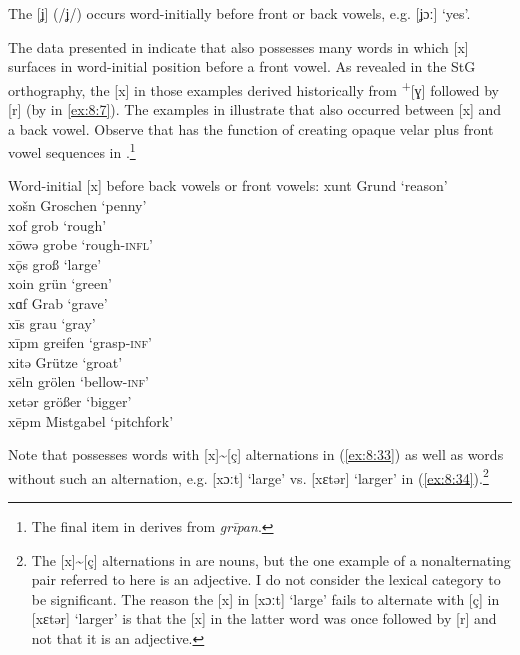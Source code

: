 The  [ʝ] (/ʝ/) occurs word-initially before front or back vowels, e.g. [ʝɔː] ‘yes’.

\begin{sloppypar}
The data presented in  indicate that  also possesses many words in which [x] surfaces in word-initial position before a front vowel. As revealed in the StG orthography, the [x] in those examples derived historically from  \textsuperscript{+}[ɣ] followed by [r] (by  in \ref{ex:8:7}). The examples in  illustrate that  also occurred between [x] and a back vowel. Observe that  has the function of creating opaque velar plus front vowel sequences in .\footnote{The final item in  derives from  \textit{grīpan}.}
\end{sloppypar}

\ea%
\label{ex:8:34}Word-initial [x] before back vowels or front vowels:
\ea\label{ex:8:34a} xunt \tab [xʊnt] \tab Grund \tab ‘reason’ \\
    xošn \tab [xɔʃn̩] \tab Groschen \tab ‘penny’ \\
    xof \tab [xɔf] \tab grob \tab ‘rough’ \\
    xōwə \tab [xoːvə] \tab grobe \tab ‘rough\textsc{{}-infl}’ \\
    xǭs \tab [xɔːt] \tab groß \tab ‘large’ \\
    xoin \tab [xoin] \tab grün \tab ‘green’ \\
    xɑf \tab [xɑf] \tab Grab \tab ‘grave’ \\
\ex\label{ex:8:34b}  xīs \tab [xiːs] \tab grau \tab ‘gray’ \\
     xīpm \tab [xiːpm̩] \tab greifen \tab ‘grasp\textsc{{}-inf}’ \\
     xitə \tab [xɪtə] \tab Grütze \tab ‘groat’ \\
     xēln \tab [xeːln] \tab grölen \tab ‘bellow\textsc{{}-inf}’ \\
     xetər \tab [xɛtər] \tab größer \tab ‘bigger’ \\
     xēpm  \tab [xɛːpm̩] \tab Mistgabel \tab ‘pitchfork’ 
    \z
\z 

Note that  possesses words with [x]{\textasciitilde}[ç] alternations in (\ref{ex:8:33}) as well as words without such an alternation, e.g. [xɔːt] ‘large’ vs. [xɛtər] ‘larger’ in (\ref{ex:8:34}).\footnote{{The [x]{\textasciitilde}[ç] alternations in  are nouns, but the one example of a nonalternating pair referred to here is an adjective. I do not consider the lexical category to be significant. The reason the [x] in [xɔːt] ‘large’ fails to alternate with [ç] in [xɛtər] ‘larger’ is that the [x] in the latter word was once followed by [r] and not that it is an adjective.} }

